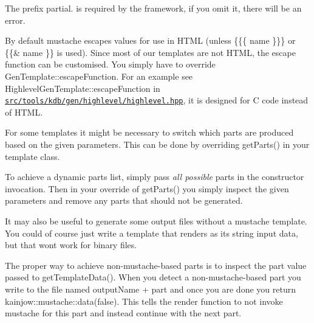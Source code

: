 The prefix {\ttfamily partial.} is required by the framework, if you omit it, there will be an error.

By default mustache escapes values for use in H\+T\+ML (unless {\ttfamily \{\{\{ name \}\}\}} or {\ttfamily \{\{\& name \}\}} is used). Since most of our templates are not H\+T\+ML, the escape function can be customised. You simply have to override {\ttfamily Gen\+Template\+::escape\+Function}. For an example see {\ttfamily Highlevel\+Gen\+Template\+::escape\+Function} in \href{/home/jenkins/workspace/libelektra-release/src/tools/kdb/gen/highlevel/highlevel.hpp}{\tt {\ttfamily src/tools/kdb/gen/highlevel/highlevel.\+hpp}}, it is designed for C code instead of H\+T\+ML.

For some templates it might be necessary to switch which parts are produced based on the given parameters. This can be done by overriding {\ttfamily get\+Parts()} in your template class.

To achieve a dynamic parts list, simply pass {\itshape all possible} parts in the constructor invocation. Then in your override of {\ttfamily get\+Parts()} you simply inspect the given parameters and remove any parts that should not be generated.

It may also be useful to generate some output files without a mustache template. You could of course just write a template that renders as its string input data, but that won\textquotesingle{}t work for binary files.

The proper way to achieve non-\/mustache-\/based parts is to inspect the {\ttfamily part} value passed to {\ttfamily get\+Template\+Data()}. When you detect a non-\/mustache-\/based part you write to the file named {\ttfamily output\+Name + part} and once you are done you return {\ttfamily kainjow\+::mustache\+::data(false)}. This tells the render function to not invoke mustache for this part and instead continue with the next part. 